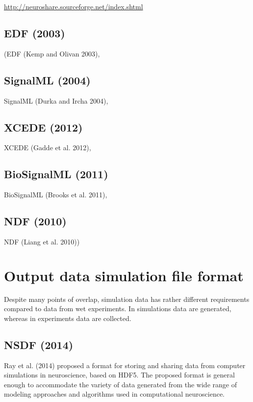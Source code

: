 \url{http://neuroshare.sourceforge.net/index.shtml}

\section{EDF (2003)}
\label{sec:EDF-format}

(EDF (Kemp and Olivan
2003), 

\section{SignalML (2004)}
\label{sec:SignalML-format}


SignalML (Durka and Ircha 2004), 

\section{XCEDE (2012)}
\label{sec:XCEDE}

XCEDE (Gadde et al. 2012), 

\section{BioSignalML (2011)}
\label{sec:BioSignalML-format}

BioSignalML (Brooks et al. 2011), 

\section{NDF (2010)}
\label{sec:NDF-format}

NDF (Liang et al. 2010))

\chapter{Output data simulation file format }

Despite many points of overlap, simulation data has rather different
requirements compared to data from wet experiments. In simulations data are
generated, whereas in experiments data are collected.

\section{NSDF (2014)}
\label{sec:NSDF-format}

Ray et al. (2014) proposed a format for storing and sharing data from computer
simulations in neuroscience, based on HDF5.
The proposed format is general enough to accommodate the variety of data
generated from the wide range of modeling approaches and algorithms used in
computational neuroscience.

